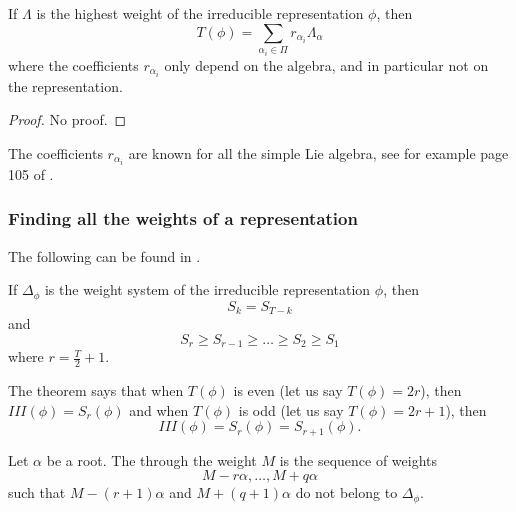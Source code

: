 \begin{theorem}     \label{ThoLLralphatablefo}
	If $\Lambda$ is the highest weight of the irreducible representation $\phi$, then
	\begin{equation}
		T(\phi)=\sum_{\alpha_i\in\Pi}r_{\alpha_i}\Lambda_{\alpha}
	\end{equation}
	where the coefficients $r_{\alpha_i}$ only depend on the algebra, and in particular not on the representation.
\end{theorem}
\begin{proof}
	No proof.
\end{proof}
The coefficients $r_{\alpha_i}$ are known for all the simple Lie algebra, see for example page 105 of \cite{Wybourne}.

\subsubsection{Finding all the weights of a representation}

The following can be found in \cite{rncahn,Wybourne}.

\begin{theorem}
	If $\Delta_{\phi}$ is the weight system of the irreducible representation $\phi$, then
	\begin{equation}
		S_k=S_{T-k}
	\end{equation}
	and
	\begin{equation}
		S_r\geq S_{r-1}\geq\ldots\geq S_2\geq S_1
	\end{equation}
	where $r=\frac{ T }{ 2 }+1$.
\end{theorem}
The theorem says that when $T(\phi)$ is even (let us say $T(\phi)=2r$), then $III(\phi)=S_r(\phi)$ and when $T(\phi)$ is odd (let us say $T(\phi)=2r+1$), then
\begin{equation}
	III(\phi)=S_r(\phi)=S_{r+1}(\phi).
\end{equation}

Let $\alpha$ be a root. The  through the weight $M$ is the sequence of weights
\begin{equation}
	M-r\alpha,\ldots,M+q\alpha
\end{equation}
such that $M-(r+1)\alpha$ and $M+(q+1)\alpha$ do not belong to $\Delta_{\phi}$.

